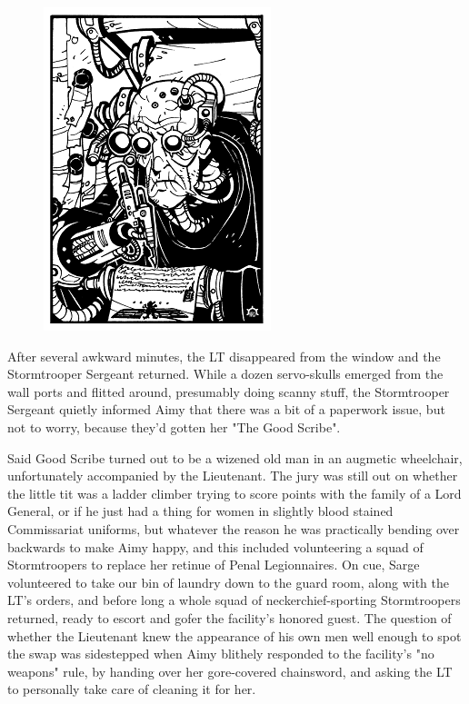 \begin{figure}
	\begin{center}
		\includegraphics[width=\figwidth]{pics/21/70.png}
	\end{center}
\end{figure}
After several awkward minutes, the LT disappeared from the window and the Stormtrooper Sergeant returned. 
While a dozen servo-skulls emerged from the wall ports and flitted around, presumably doing scanny stuff, the Stormtrooper Sergeant quietly informed Aimy that there was a bit of a paperwork issue, but not to worry, because they'd gotten her "The Good Scribe". 


Said Good Scribe turned out to be a wizened old man in an augmetic wheelchair, unfortunately accompanied by the Lieutenant. 
The jury was still out on whether the little tit was a ladder climber trying to score points with the family of a Lord General, or if he just had a thing for women in slightly blood stained Commissariat uniforms, but whatever the reason he was practically bending over backwards to make Aimy happy, and this included volunteering a squad of Stormtroopers to replace her retinue of Penal Legionnaires. 
On cue, Sarge volunteered to take our bin of laundry down to the guard room, along with the LT's orders, and before long a whole squad of neckerchief-sporting Stormtroopers returned, ready to escort and gofer the facility's honored guest. 
The question of whether the Lieutenant knew the appearance of his own men well enough to spot the swap was sidestepped when Aimy blithely responded to the facility's "no weapons" rule, by handing over her gore-covered chainsword, and asking the LT to personally take care of cleaning it for her.

